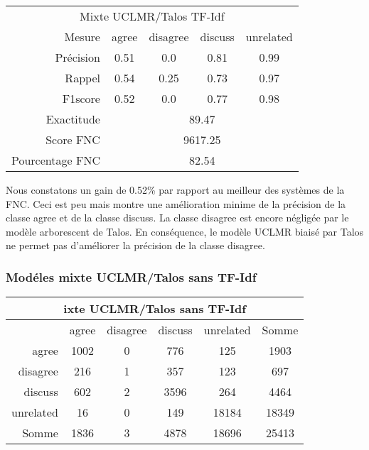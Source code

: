 \documentclass[onecolumn, 12pt]{article}
\begin{document}
\begin{center}
 \begin{tabular}{ r | c c c c }
  \multicolumn{5}{c}{Mixte UCLMR/Talos TF-Idf}                                   \\
  Mesure          & agree                       & disagree & discuss & unrelated \\
  \hline
  Précision       & 0.51                        & 0.0      & 0.81    & 0.99      \\
  Rappel          & 0.54                        & 0.25     & 0.73    & 0.97      \\
  F1score         & 0.52                        & 0.0      & 0.77    & 0.98      \\
  \hline
  \hline
  Exactitude      & \multicolumn{4}{c}{89.47}                                    \\
  Score FNC       & \multicolumn{4}{c}{9617.25}                                  \\
  Pourcentage FNC & \multicolumn{4}{c}{82.54}                                    \\
 \end{tabular}
\end{center}
Nous constatons un gain de 0.52\% par rapport au meilleur des systèmes de la FNC.
Ceci est peu mais montre une amélioration minime de la précision de la classe agree et de la classe discuss.
La classe disagree est encore négligée par le modèle arborescent de Talos.
En conséquence, le modèle UCLMR biaisé par Talos ne permet pas d'améliorer la précision de la classe disagree.


\subsubsection{Modéles mixte UCLMR/Talos sans TF-Idf}
\begin{center}
 \begin{tabular}{ r | c c c c | c }
  \multicolumn{6}{c}{ixte UCLMR/Talos sans TF-Idf}           \\
  \hline
            & agree & disagree & discuss & unrelated & Somme \\
  \hline
  agree     & 1002  & 0        & 776     & 125       & 1903  \\
  disagree  & 216   & 1        & 357     & 123       & 697   \\
  discuss   & 602   & 2        & 3596    & 264       & 4464  \\
  unrelated & 16    & 0        & 149     & 18184     & 18349 \\
  \hline
  Somme     & 1836  & 3        & 4878    & 18696     & 25413 \\
 \end{tabular}
\end{center}
\end{document}
